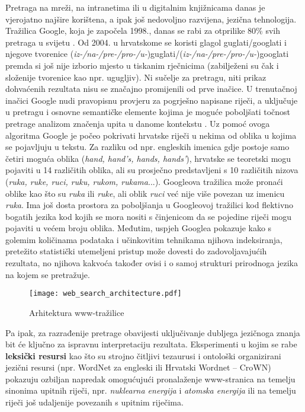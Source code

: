 \begin{multicols}{2}
Pretraga na mreži, na intranetima ili u digitalnim knjižnicama danas je vjerojatno najšire korištena, a ipak još nedovoljno razvijena, jezična tehnologija. Tražilica Google, koja je započela 1998., danas se rabi za otprilike 80\% svih pretraga u svijetu \cite{str14}. Od 2004. u hrvatskome se koristi glagol guglati/googlati i njegove tvorenice (\emph{iz-/na-/pre-/pro-/u-})guglati/(\emph{iz-/na-/pre-/pro-/u-})googlati premda si još nije izborio mjesto u tiskanim rječnicima (zabilježeni su čak i složenije tvorenice kao npr. ugugljiv). Ni sučelje za pretragu, niti prikaz dohvaćenih rezultata nisu se značajno promijenili od prve inačice. U trenutačnoj inačici Google nudi pravopisnu provjeru za pogrješno napisane riječi, a uključuje u pretragu i osnovne semantičke elemente kojima je moguće poboljšati točnost pretrage analizom značenja upita u danome kontekstu \cite{str15}. Uz pomoć ovoga algoritma Google je počeo pokrivati hrvatske riječi u nekima od oblika u kojima se pojavljuju u tekstu. Za razliku od npr. engleskih imenica gdje postoje samo četiri moguća oblika (\emph{hand, hand’s, hands, hands’}), hrvatske se teoretski mogu pojaviti u 14 različitih oblika, ali su prosječno predstavljeni s 10 različitih nizova (\emph{ruka, ruke, ruci, ruku, rukom, rukama}...). Googleova tražilica može pronaći oblike kao što su \emph{ruka} ili \emph{ruke}, ali oblik \emph{ruci} već nije više povezan uz imenicu \emph{ruka}. Ima još dosta prostora za poboljšanja u Googleovoj tražilici kod flektivno bogatih jezika kod kojih se mora nositi s činjenicom da se pojedine riječi mogu pojaviti u većem broju oblika. Međutim, uspjeh Googlea pokazuje kako s golemim količinama podataka i učinkovitim tehnikama njihova indeksiranja, pretežito statistički utemeljeni pristup može dovesti do zadovoljavajućih rezultata, no njihova kakvoća također ovisi i o samoj strukturi prirodnoga jezika na kojem se pretražuje.

\begin{figure*}[htb]
  \center
  \texttt{[image: web\_search\_architecture.pdf]}
  \caption{Arhitektura www-tražilice}
  \label{fig:websearcharch_cro}
\end{figure*}

Pa ipak, za razrađenije pretrage obavijesti uključivanje dubljega jezičnoga znanja bit će ključno za ispravnu interpretaciju rezultata. Eksperimenti u kojim se rabe \textbf{leksički resursi} kao što su strojno čitljivi tezaurusi i ontološki organizirani jezični resursi (npr. WordNet za engleski ili Hrvatski Wordnet – CroWN) pokazuju ozbiljan napredak omogućujući pronalaženje www-stranica na temelju sinonima upitnih riječi, npr. \emph{nuklearna energija} i \emph{atomska energija} ili na temelju riječi još udaljenije povezanih s upitnim riječima.


\end{multicols}
